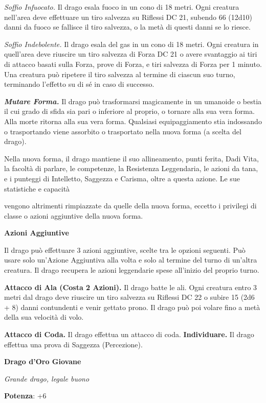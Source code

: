 \begin{multicols}{2}
\emph{Soffio Infuocato.} Il drago esala fuoco in un cono di 18 metri.
Ogni creatura nell'area deve effettuare un tiro salvezza su Riflessi DC
21, subendo 66 (12d10) danni da fuoco se fallisce il tiro salvezza, o la
metà di questi danni se lo riesce.

\emph{Soffio Indebolente.} Il drago esala del gas in un cono di 18
metri. Ogni creatura in quell'area deve riuscire un tiro salvezza di Forza DC 21 o avere svantaggio ai tiri di attacco basati sulla Forza,
prove di Forza, e tiri salvezza di Forza per 1 minuto. Una creatura può
ripetere il tiro salvezza al termine di ciascun suo turno, terminando
l'effetto su di sé in caso di successo.

\emph{\textbf{Mutare Forma.}} Il drago può trasformarsi magicamente in
un umanoide o bestia il cui grado di sfida sia pari o inferiore al
proprio, o tornare alla sua vera forma. Alla morte ritorna alla sua vera
forma. Qualsiasi equipaggiamento stia indossando o trasportando viene
assorbito o trasportato nella nuova forma (a scelta del drago).

Nella nuova forma, il drago mantiene il suo allineamento, punti ferita,
Dadi Vita, la facoltà di parlare, le competenze, la Resistenza
Leggendaria, le azioni da tana, e i punteggi di Intelletto, Saggezza e
Carisma, oltre a questa azione. Le sue statistiche e capacità

vengono altrimenti rimpiazzate da quelle della nuova forma, eccetto i
privilegi di classe o azioni aggiuntive della nuova forma.

\textbf{Azioni Aggiuntive}

Il drago può effettuare 3 azioni aggiuntive, scelte tra le opzioni
seguenti. Può usare solo un'Azione Aggiuntiva alla volta e solo al
termine del turno di un'altra creatura. Il drago recupera le azioni
leggendarie spese all'inizio del proprio turno.

\textbf{Attacco di Ala (Costa 2 Azioni).} Il drago batte le ali. Ogni
creatura entro 3 metri dal drago deve riuscire un tiro salvezza su Riflessi DC 22 o subire 15 (2d6 + 8) danni contundenti e venir gettato
prono. Il drago può poi volare fino a metà della sua velocità di volo.

\textbf{Attacco di Coda.} Il drago effettua un attacco di coda.
\textbf{Individuare.} Il drago effettua una prova di Saggezza
(Percezione).

\textbf{Drago d'Oro Giovane}

\emph{Grande drago, legale buono}

\textbf{Potenza}: +6


\end{multicols}
